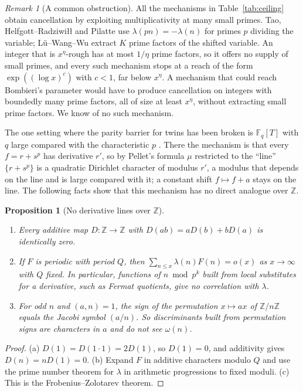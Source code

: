 \documentclass[11pt]{amsart}
\newtheorem{proposition}[theorem]{Proposition}
\theoremstyle{definition}
\theoremstyle{remark}
\newtheorem{remark}[theorem]{Remark}
\begin{document}
\begin{remark}[A common obstruction]\label{rem:common}
All the mechanisms in Table~\ref{tab:ceiling} obtain cancellation by exploiting multiplicativity at many small primes. Tao, Helfgott--Radziwi\l{}\l{} and Pilatte use $\lambda(pn)=-\lambda(n)$ for primes $p$ dividing the variable; Lü--Wang--Wu extract $K$ prime factors of the shifted variable. An integer that is $x^\eta$-rough has at most $1/\eta$ prime factors, so it offers no supply of small primes, and every such mechanism stops at a reach of the form $\exp((\log x)^{c})$ with $c<1$, far below $x^\eta$. A mechanism that could reach Bombieri's parameter would have to produce cancellation on integers with boundedly many prime factors, all of size at least $x^\eta$, without extracting small prime factors. We know of no such mechanism.
\end{remark}

The one setting where the parity barrier for twins has been broken is $\mathbb F_q[T]$ with $q$ large compared with the characteristic $p$ \cite{SS22}. There the mechanism is that every $f=r+s^p$ has derivative $r'$, so by Pellet's formula $\mu$ restricted to the ``line'' $\{r+s^p\}$ is a quadratic Dirichlet character of modulus $r'$, a modulus that depends on the line and is large compared with it; a constant shift $f\mapsto f+a$ stays on the line. The following facts show that this mechanism has no direct analogue over $\mathbb Z$.

\begin{proposition}[No derivative lines over $\mathbb Z$]\label{prop:noderiv}
\leavevmode
\begin{enumerate}
\item[(a)] Every additive map $D:\mathbb Z\to\mathbb Z$ with $D(ab)=aD(b)+bD(a)$ is identically zero.
\item[(b)] If $F$ is periodic with period $Q$, then $\sum_{n\le x}\lambda(n)F(n)=o(x)$ as $x\to\infty$ with $Q$ fixed. In particular, functions of $n\bmod p^k$ built from local substitutes for a derivative, such as Fermat quotients, give no correlation with $\lambda$.
\item[(c)] For odd $n$ and $(a,n)=1$, the sign of the permutation $x\mapsto ax$ of $\mathbb Z/n\mathbb Z$ equals the Jacobi symbol $(a/n)$. So discriminants built from permutation signs are characters in $a$ and do not see $\omega(n)$.
\end{enumerate}
\end{proposition}
\begin{proof}
(a) $D(1)=D(1\cdot1)=2D(1)$, so $D(1)=0$, and additivity gives $D(n)=nD(1)=0$. (b) Expand $F$ in additive characters modulo $Q$ and use the prime number theorem for $\lambda$ in arithmetic progressions to fixed moduli. (c) This is the Frobenius--Zolotarev theorem.
\end{proof}
\end{document}
